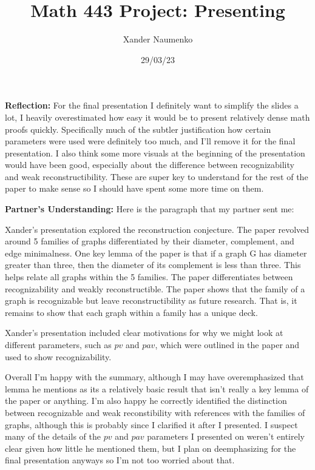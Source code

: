 \documentclass[letterpaper, reqno,11pt]{article}
\begin{document}
\title{Math 443 Project: Presenting}
\date{29/03/23}
\author{Xander Naumenko}
\maketitle

{\medskip\noindent\bf Reflection:} For the final presentation I definitely want to simplify the slides a lot, I heavily overestimated how easy it would be to present relatively dense math proofs quickly. Specifically much of the subtler justification how certain parameters were used were definitely too much, and I'll remove it for the final presentation. I also think some more visuals at the beginning of the presentation would have been good, especially about the difference between recognizability and weak reconstructibility. These are super key to understand for the rest of the paper to make sense so I should have spent some more time on them.

{\medskip\noindent\bf Partner's Understanding:} Here is the paragraph that my partner sent me: 

\medskip

Xander’s presentation explored the reconstruction conjecture. The paper revolved around 5 families of graphs differentiated by their diameter, complement, and edge minimalness. One key lemma of the paper is that if a graph G has diameter greater than three, then the diameter of its complement is less than three. This helps relate all graphs within the 5 families. The paper differentiates between recognizability and weakly reconstructible. The paper shows that the family of a graph is recognizable but leave reconstructibility as future research. That is, it remains to show that each graph within a family has a unique deck. 

Xander’s presentation included clear motivations for why we might look at different parameters, such as $pv$ and $pav$, which were outlined in the paper and used to show recognizability.

\medskip

Overall I'm happy with the summary, although I may have overemphasized that lemma he mentions as its a relatively basic result that isn't really a key lemma of the paper or anything. I'm also happy he correctly identified the distinction between recognizable and weak reconstibility with references with the families of graphs, although this is probably since I clarified it after I presented. I suspect many of the details of the $pv$ and $pav$ parameters I presented on weren't entirely clear given how little he mentioned them, but I plan on deemphasizing for the final presentation anyways so I'm not too worried about that.
\end{document}
